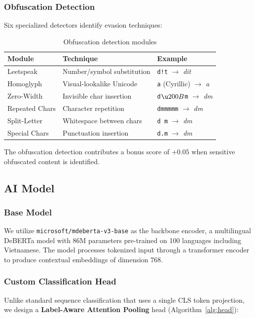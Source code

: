 \documentclass[12pt,a4paper]{article}
\begin{document}
\subsubsection{Obfuscation Detection}
Six specialized detectors identify evasion techniques:

\begin{table}[htbp]
    \centering
    \caption{Obfuscation detection modules}
    \label{tab:obfuscation}
    \begin{tabular}{@{}lll@{}}
        \toprule
        \textbf{Module} & \textbf{Technique} & \textbf{Example} \\
        \midrule
        Leetspeak    & Number/symbol substitution & \texttt{d!t} $\rightarrow$ \textit{dit} \\
        Homoglyph    & Visual-lookalike Unicode   & \texttt{а} (Cyrillic) $\rightarrow$ \textit{a} \\
        Zero-Width   & Invisible char insertion   & \texttt{d$\u200B$m} $\rightarrow$ \textit{dm} \\
        Repeated Chars & Character repetition     & \texttt{dmmmmm} $\rightarrow$ \textit{dm} \\
        Split-Letter & Whitespace between chars   & \texttt{d m} $\rightarrow$ \textit{dm} \\
        Special Chars & Punctuation insertion     & \texttt{d.m} $\rightarrow$ \textit{dm} \\
        \bottomrule
    \end{tabular}
\end{table}

The obfuscation detection contributes a bonus score of $+0.05$ when sensitive obfuscated content is identified.

\subsection{AI Model}

\subsubsection{Base Model}
We utilize \texttt{microsoft/mdeberta-v3-base} as the backbone encoder, a multilingual DeBERTa model with 86M parameters pre-trained on 100 languages including Vietnamese.
The model processes tokenized input through a transformer encoder to produce contextual embeddings of dimension 768.

\subsubsection{Custom Classification Head}
Unlike standard sequence classification that uses a single CLS token projection, we design a \textbf{Label-Aware Attention Pooling} head (Algorithm~\ref{alg:head}):
\end{document}
